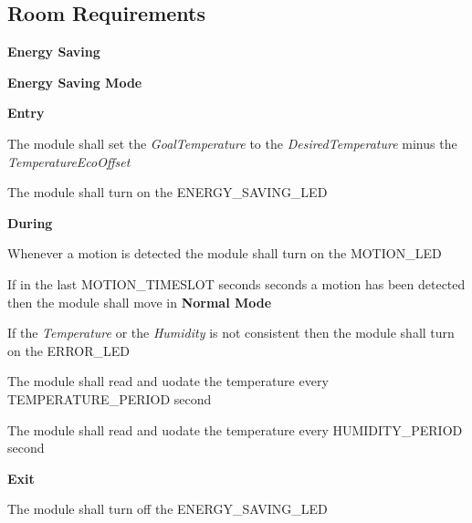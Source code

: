 \subsection{Room Requirements}
		\begin{req_enum}
			\item \textbf{Energy Saving}
				\begin{req_enum}[label*=\arabic*.]
					\item \textbf{Energy Saving Mode}
						\begin{req_enum}[label*=\arabic*.]
							\item \textbf{Entry}
								\begin{req_enum}[label*=\arabic*.]
									\item The module shall set the \textit{GoalTemperature} to the \textit{DesiredTemperature} minus the \textit{TemperatureEcoOffset}
									\item The module shall turn on the ENERGY\_SAVING\_LED
								\end{req_enum}
							\item \textbf{During}
								\begin{req_enum}[label*=\arabic*.]
									\item Whenever a motion is detected the module shall turn on the MOTION\_LED
									\item If in the last MOTION\_TIMESLOT seconds  seconds a motion has been detected then the module shall move in \textbf{Normal Mode}
									\item If the \textit{Temperature} or the \textit{Humidity} is not consistent then the module shall turn on the ERROR\_LED
									\item The module shall read and uodate the temperature every TEMPERATURE\_PERIOD  second
									\item The module shall read and uodate the temperature every HUMIDITY\_PERIOD  second
								\end{req_enum}
							\item \textbf{Exit}
								\begin{req_enum}[label*=\arabic*.]
									\item The module shall turn off the ENERGY\_SAVING\_LED
								\end{req_enum}
						\end{req_enum}
	

\end{req_enum}
\end{req_enum}
